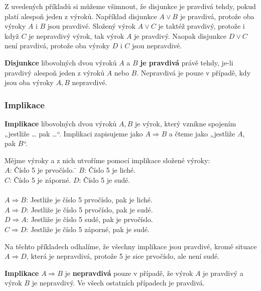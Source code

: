 \documentclass[12pt,a4paper]{article}
\begin{document}
Z uvedených příkladů si můžeme všimnout, že disjunkce je pravdivá tehdy, pokud platí alespoň jeden z výroků.  
Například disjunkce $A \lor B$ je pravdivá, protože oba výroky $A$ i $B$ jsou pravdivé. Složený výrok $A \lor C$ je taktéž pravdivý, protože i když $C$ je nepravdivý výrok, tak výrok $A$ je pravdivý.  
Naopak disjunkce $D \lor C$ není pravdivá, protože oba výroky $D$ i $C$ jsou nepravdivé.

\begin{definitionbox}
    \textbf{Disjunkce} libovolných dvou výroků $A$ a $B$ \textbf{je pravdivá} právě tehdy, je-li pravdivý alespoň jeden z výroků $A$ nebo $B$.  
    Nepravdivá je pouze v případě, kdy jsou oba výroky $A, B$ nepravdivé.
\end{definitionbox}

\subsubsection*{Implikace}
\begin{definitionbox}
    \textbf{Implikace} libovolných dvou výroků $A, B$ je výrok, který vznikne spojením „jestliže … pak …“.  
    Implikaci zapisujeme jako $A \Rightarrow B$ a čteme jako „jestliže $A$, pak $B$“.
\end{definitionbox}
\newpage
\begin{examplebox}
\begin{tabbing}
    Mějme výroky a z nich utvoříme pomocí implikace složené výroky:\\
    $A$: Číslo 5 je prvočíslo. \= 
    $B$: Číslo 5 je liché.\\
    $C$: Číslo 5 je záporné.\>
    $D$: Číslo 5 je sudé.\\
    \\
    $A \Rightarrow B$: Jestliže je číslo 5 prvočíslo, pak je liché. \\ 
    $A \Rightarrow D$: Jestliže je číslo 5 prvočíslo, pak je sudé. \\
    $D \Rightarrow A$: Jestliže je číslo 5 sudé, pak je prvočíslo.\\
    $C \Rightarrow D$: Jestliže je číslo 5 záporné, pak je sudé.
\end{tabbing}
\end{examplebox}

Na těchto příkladech odhalíme, že všechny implikace jsou pravdivé, kromě situace $A \Rightarrow D$, která je nepravdivá, protože 5 je sice prvočíslo, ale není sudé.  

\begin{definitionbox}
    \textbf{Implikace} $A \Rightarrow B$ je \textbf{nepravdivá} pouze v případě, že výrok $A$ je pravdivý a výrok $B$ je nepravdivý.  
    Ve všech ostatních případech je pravdivá.
\end{definitionbox}
\end{document}
